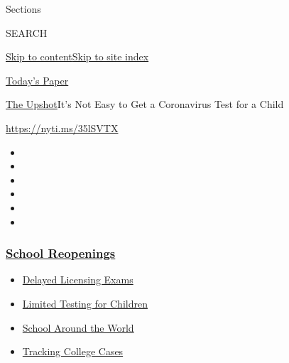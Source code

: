 Sections

SEARCH

\protect\hyperlink{site-content}{Skip to
content}\protect\hyperlink{site-index}{Skip to site index}

\href{https://myaccount.nytimes3xbfgragh.onion/auth/login?response_type=cookie\&client_id=vi}{}

\href{https://www.nytimes3xbfgragh.onion/section/todayspaper}{Today's
Paper}

\href{/section/upshot}{The Upshot}\textbar{}It's Not Easy to Get a
Coronavirus Test for a Child

\url{https://nyti.ms/35lSVTX}

\begin{itemize}
\item
\item
\item
\item
\item
\item
\end{itemize}

\hypertarget{school-reopenings}{%
\subsubsection{\texorpdfstring{\href{https://www.nytimes3xbfgragh.onion/spotlight/schools-reopening?name=styln-coronavirus-schools-reopening\&region=TOP_BANNER\&block=storyline_menu_recirc\&action=click\&pgtype=Article\&impression_id=a24d4900-f279-11ea-a8e6-7d6a1fa58798\&variant=undefined}{School
Reopenings}}{School Reopenings}}\label{school-reopenings}}

\begin{itemize}
\tightlist
\item
  \href{https://www.nytimes3xbfgragh.onion/2020/09/04/us/bar-exam-coronavirus.html?name=styln-coronavirus-schools-reopening\&region=TOP_BANNER\&block=storyline_menu_recirc\&action=click\&pgtype=Article\&impression_id=a24d7010-f279-11ea-a8e6-7d6a1fa58798\&variant=undefined}{Delayed
  Licensing Exams}
\item
  \href{https://www.nytimes3xbfgragh.onion/2020/09/08/upshot/children-testing-shortfalls-virus.html?name=styln-coronavirus-schools-reopening\&region=TOP_BANNER\&block=storyline_menu_recirc\&action=click\&pgtype=Article\&impression_id=a24d7011-f279-11ea-a8e6-7d6a1fa58798\&variant=undefined}{Limited
  Testing for Children}
\item
  \href{https://www.nytimes3xbfgragh.onion/2020/09/01/world/schools-reopen-globe-students.html?name=styln-coronavirus-schools-reopening\&region=TOP_BANNER\&block=storyline_menu_recirc\&action=click\&pgtype=Article\&impression_id=a24d7012-f279-11ea-a8e6-7d6a1fa58798\&variant=undefined}{School
  Around the World}
\item
  \href{https://www.nytimes3xbfgragh.onion/interactive/2020/us/covid-college-cases-tracker.html?name=styln-coronavirus-schools-reopening\&region=TOP_BANNER\&block=storyline_menu_recirc\&action=click\&pgtype=Article\&impression_id=a24d9720-f279-11ea-a8e6-7d6a1fa58798\&variant=undefined}{Tracking
  College Cases}
\end{itemize}

